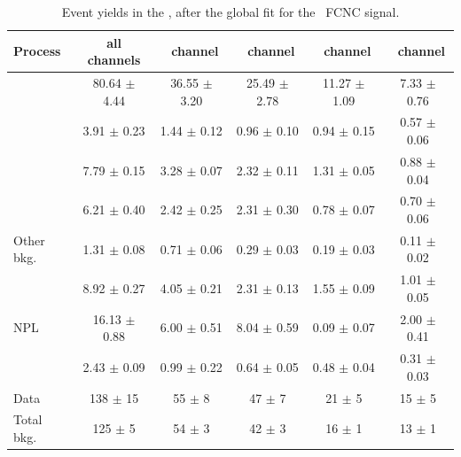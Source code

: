 \begin{landscape}	
	\vspace*{\fill}
	
	\begin{table}[htbp]
		\centering
		\caption{Event yields in the \STSR, after the global fit for the \Zut\ FCNC signal. }
		
		\begin{tabular} {l c c c c c   }
			\toprule
			Process &   all channels & \mumumu\ channel & \emumu\ channel & \eemu\ channel &\eee\ channel\\
			\midrule
			\NPL\ \DY    & 80.64  $ \pm $  4.44& 36.55 $ \pm $ 3.20& 25.49 $\pm$ 2.78 & 11.27 $\pm$ 1.09 & 7.33 $\pm$ 0.76 \\ 
			\ttZ         & 3.91 $ \pm $ 0.23 & 1.44 $ \pm $ 0.12   &  0.96 $\pm$ 0.10 &  0.94 $\pm$ 0.15 & 0.57 $\pm$ 0.06\\ 
			\WZ          & 7.79 $ \pm $ 0.15 & 3.28 $ \pm $ 0.07   &  2.32 $\pm$ 0.11 &  1.31 $\pm$ 0.05 & 0.88 $\pm$ 0.04\\ 
			\ZZ 		 & 6.21 $ \pm $ 0.40 & 2.42 $ \pm $ 0.25   &  2.31 $\pm$ 0.30 &  0.78 $\pm$ 0.07 & 0.70 $\pm$ 0.06 \\ 
			Other bkg.   & 1.31 $ \pm $ 0.08 & 0.71 $ \pm $ 0.06   &  0.29 $\pm$ 0.03 &  0.19 $\pm$ 0.03 & 0.11 $\pm$ 0.02 \\ 
			\tZq 		 & 8.92 $ \pm $ 0.27 & 4.05 $ \pm $ 0.21   &  2.31 $\pm$ 0.13 &  1.55 $\pm$ 0.09 & 1.01 $\pm$ 0.05\\ 
			NPL \ttbar   &16.13 $ \pm $ 0.88 & 6.00 $ \pm $ 0.51   &  8.04 $\pm$ 0.59 &  0.09 $\pm$ 0.07 & 2.00 $\pm$ 0.41 \B\\
			\kZut  		 & 2.43 $ \pm $ 0.09 & 0.99 $ \pm $ 0.22   &  0.64 $\pm$ 0.05 &  0.48 $\pm$ 0.04 & 0.31 $\pm$ 0.03 \T\B \\
			\hdashline
			Data         & 138 $ \pm $ 15 & 55 $\pm$ 8 & 47 $\pm$ 7 & 21 $\pm$ 5 & 15 $\pm$ 5 \T\\
			Total bkg.   & 125 $ \pm $  5 & 54 $\pm$ 3 & 42 $\pm$ 3 & 16 $\pm$ 1 & 13 $\pm$ 1 \\
			\bottomrule
		\end{tabular}
		\label{tab:PYieldSTSR}
	\end{table}
	\vspace*{\fill}
\end{landscape}


